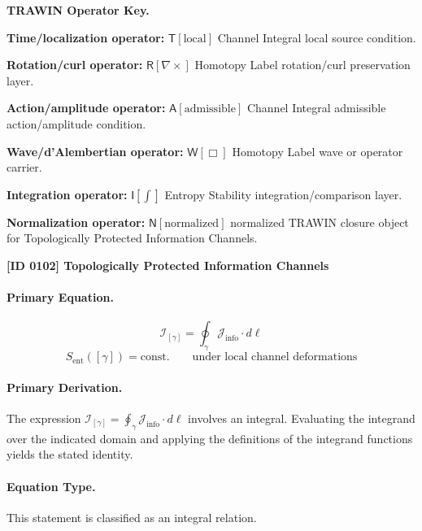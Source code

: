 \par\vspace{0.45\baselineskip}
\noindent\begin{minipage}[t]{\linewidth}
\begingroup
\small
\raggedright
\textbf{TRAWIN Operator Key.}\par
\noindent\textbf{Time/localization operator:} $\mathsf{T}\!\left[\mathrm{local}\right]$ Channel Integral local source condition.\par
\noindent\textbf{Rotation/curl operator:} $\mathsf{R}\!\left[\nabla\times\right]$ Homotopy Label rotation/curl preservation layer.\par
\noindent\textbf{Action/amplitude operator:} $\mathsf{A}\!\left[\mathrm{admissible}\right]$ Channel Integral admissible action/amplitude condition.\par
\noindent\textbf{Wave/d'Alembertian operator:} $\mathsf{W}\!\left[\Box\right]$ Homotopy Label wave or operator carrier.\par
\noindent\textbf{Integration operator:} $\mathsf{I}\!\left[\int\right]$ Entropy Stability integration/comparison layer.\par
\noindent\textbf{Normalization operator:} $\mathsf{N}\!\left[\mathrm{normalized}\right]$ normalized TRAWIN closure object for Topologically Protected Information Channels.\par
\endgroup
\end{minipage}

\clearpage
\noindent\textbf{[ID 0102] Topologically Protected Information Channels}\par
\vspace{0.35em}
\paragraph{Primary Equation.}
\[
\mathcal{I}_{[\gamma]} = \oint_{\gamma} \mathcal{J}_{\mathrm{info}}\cdot d\ell
\]
\[
S_{\mathrm{ent}}([\gamma]) = \mathrm{const.}
\qquad
\text{under local channel deformations}
\]

\paragraph{Primary Derivation.}
The expression \( \mathcal{I}_{[\gamma]} = \oint_{\gamma} \mathcal{J}_{\mathrm{info}}\cdot d\ell \) involves an integral. Evaluating the integrand over the indicated domain and applying the definitions of the integrand functions yields the stated identity.
\paragraph{Equation Type.}
This statement is classified as an integral relation.


